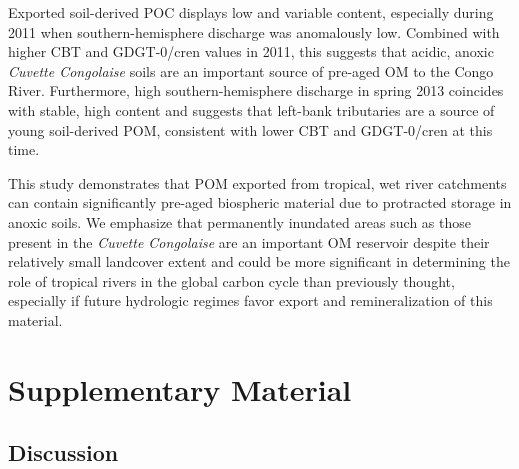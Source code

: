 Exported soil-derived POC displays low and variable  content, especially during 2011 when southern-hemisphere discharge was anomalously low. Combined with higher CBT and GDGT-0/cren values in 2011, this suggests that acidic, anoxic \textit{Cuvette Congolaise} soils are an important source of pre-aged OM to the Congo River. Furthermore, high southern-hemisphere discharge in spring 2013 coincides with stable, high  content and suggests that left-bank tributaries are a source of young soil-derived POM, consistent with lower CBT and GDGT-0/cren at this time.

This study demonstrates that POM exported from tropical, wet river catchments can contain significantly pre-aged biospheric material due to protracted storage in anoxic soils. We emphasize that permanently inundated areas such as those present in the \textit{Cuvette Congolaise} are an important OM reservoir despite their relatively small landcover extent and could be more significant in determining the role of tropical rivers in the global carbon cycle than previously thought, especially if future hydrologic regimes favor export and remineralization of this material.


\clearpage

\section{Supplementary Material}

\subsection{Discussion}

